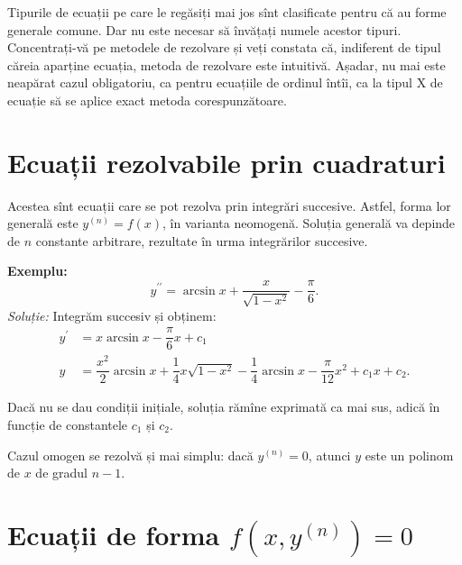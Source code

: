 
{\color{red}
  \begin{remark}\label{rk:tipuri}
    Tipurile de ecuații pe care le regăsiți mai jos sînt clasificate pentru
    că au forme generale comune. Dar nu este necesar să învățați numele
    acestor tipuri. Concentrați-vă pe metodele de rezolvare și veți constata
    că, indiferent de tipul căreia aparține ecuația, metoda de rezolvare
    este intuitivă. Așadar, nu mai este neapărat cazul obligatoriu, ca pentru
    ecuațiile de ordinul întîi, ca la tipul X de ecuație să se aplice exact
    metoda corespunzătoare.
  \end{remark}
}


\section{Ecuații rezolvabile prin cuadraturi}

\indent\indent Acestea sînt ecuații care se pot rezolva prin integrări
succesive. Astfel, forma lor generală este $ y^{(n)} = f(x) $, în varianta
neomogenă. Soluția generală va depinde de $ n $ constante arbitrare,
rezultate în urma integrărilor succesive.

\textbf{Exemplu:}
\[
  y^{\prime\prime} = \arcsin x + \frac{x}{\sqrt{1 - x^2}} - \frac{\pi}{6}.
\]
\emph{Soluție:} Integrăm succesiv și obținem:
\begin{align*}
  y^{\prime} &= x \arcsin x - \dfrac{\pi}{6} x + c_1 \\
  y &= \dfrac{x^2}{2} \arcsin x + \dfrac{1}{4}x \sqrt{1 - x^2} - %
      \dfrac{1}{4} \arcsin x - \dfrac{\pi}{12} x^2 + c_1 x + c_2.
\end{align*}

Dacă nu se dau condiții inițiale, soluția rămîne exprimată ca mai sus,
adică în funcție de constantele $ c_1 $ și $ c_2 $.

\vspace{1cm}

Cazul omogen se rezolvă și mai simplu: dacă $ y^{(n)} = 0 $, atunci
$ y $ este un polinom de $ x $ de gradul $ n - 1 $.


\section{Ecuații de forma $ f(x, y^{(n)}) = 0 $}

